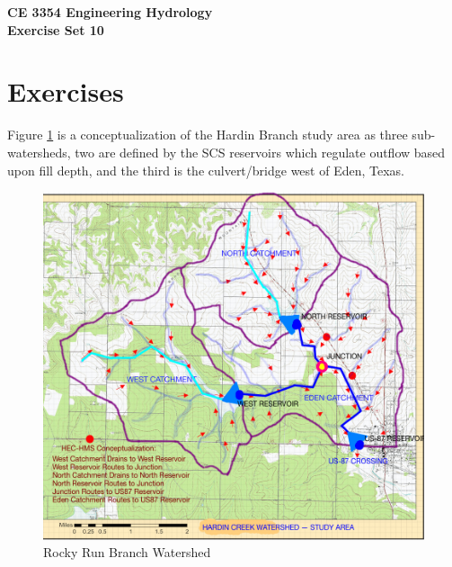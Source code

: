 \documentclass[12pt]{article}
\begin{document}
\begin{center}
{\textbf{{ CE 3354 Engineering Hydrology} \\ {Exercise Set 10}}}
\end{center}

\section*{\small{Exercises}} 

Figure \ref{fig:HEC-HMS-Conceptualization} is a conceptualization of the Hardin Branch study area as three sub-watersheds, two are defined by the SCS reservoirs which regulate outflow based upon fill depth, and the third is the culvert/bridge west of Eden, Texas.

\begin{figure}[h!] %
   \centering
   \includegraphics[width=6.0in]{HEC-HMS-Conceptualization.png} 
   \caption{Rocky Run Branch Watershed}
   \label{fig:HEC-HMS-Conceptualization}
\end{figure}
\clearpage
\end{document}
